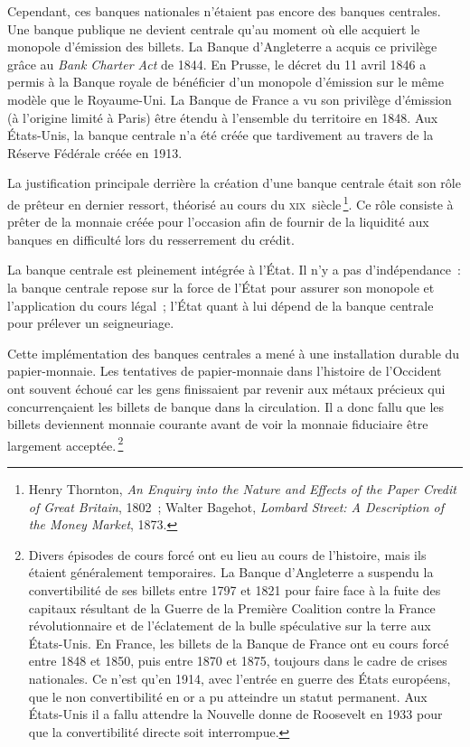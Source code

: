 \documentclass[a4paper,notitlepage]{article}
\newcommand{\eng}[1]{{\NoAutoSpaceBeforeFDP\emph{#1}}}  %
\newcommand{\sfootnote}{\,\footnote}
\begin{document}

Cependant, ces banques nationales n'étaient pas encore des banques centrales. Une banque publique ne devient centrale qu'au moment où elle acquiert le monopole d'émission des billets. La Banque d'Angleterre a acquis ce privilège grâce au \eng{Bank Charter Act} de 1844. En Prusse, le décret du 11 avril 1846 a permis à la Banque royale de bénéficier d'un monopole d'émission sur le même modèle que le Royaume-Uni. La Banque de France a vu son privilège d'émission (à l'origine limité à Paris) être étendu à l'ensemble du territoire en 1848. Aux États-Unis, la banque centrale n'a été créée que tardivement au travers de la Réserve Fédérale créée en 1913.

La justification principale derrière la création d'une banque centrale était son rôle de prêteur en dernier ressort, théorisé au cours du \textsc{xix}\ieme{}~siècle\sfootnote{Henry Thornton, \eng{An Enquiry into the Nature and Effects of the Paper Credit of Great Britain}, 1802~; Walter Bagehot, \eng{Lombard Street: A Description of the Money Market}, 1873.}. Ce rôle consiste à prêter de la monnaie créée pour l'occasion afin de fournir de la liquidité aux banques en difficulté lors du resserrement du crédit.

La banque centrale est pleinement intégrée à l'État. Il n'y a pas d'indépendance~: la banque centrale repose sur la force de l'État pour assurer son monopole et l'application du cours légal~; l'État quant à lui dépend de la banque centrale pour prélever un seigneuriage.

Cette implémentation des banques centrales a mené à une installation durable du papier-monnaie. Les tentatives de papier-monnaie dans l'histoire de l'Occident ont souvent échoué car les gens finissaient par revenir aux métaux précieux qui concurrençaient les billets de banque dans la circulation. Il a donc fallu que les billets deviennent monnaie courante avant de voir la monnaie fiduciaire être largement acceptée.\sfootnote{Divers épisodes de cours forcé ont eu lieu au cours de l'histoire, mais ils étaient généralement temporaires. La Banque d'Angleterre a suspendu la convertibilité de ses billets entre 1797 et 1821 pour faire face à la fuite des capitaux résultant de la Guerre de la Première Coalition contre la France révolutionnaire et de l'éclatement de la bulle spéculative sur la terre aux États-Unis. En France, les billets de la Banque de France ont eu cours forcé entre 1848 et 1850, puis entre 1870 et 1875, toujours dans le cadre de crises nationales. Ce n'est qu'en 1914, avec l'entrée en guerre des États européens, que le non convertibilité en or a pu atteindre un statut permanent. Aux États-Unis il a fallu attendre la Nouvelle donne de Roosevelt en 1933 pour que la convertibilité directe soit interrompue.}
\end{document}
